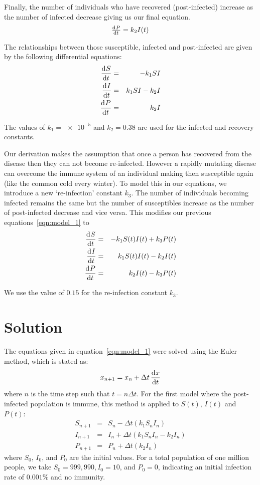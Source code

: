 \documentclass[a4paper,11pt]{article}
\begin{document}
Finally, the number of individuals who have recovered (post-infected) increase
as the number of infected decrease giving us our final equation.
\begin{equation}
\od{P}{t} = k_2I(t)
\end{equation}

The relationships between those susceptible, infected and post-infected are given
by the following differential equations:
\begin{eqnarray}
   \dod{S}{t} &=& -k_1SI         \nonumber \\
   \dod{I}{t} &=& k_1SI - k_2I   \nonumber \\
   \dod{P}{t} &=& k_2I
\label{eqn:model_1}
\end{eqnarray}

The values of $k_1 = \num{e-5}$ and $k_2 = 0.38$ are used for the infected and 
recovery constants.

Our derivation makes the assumption that once a person has recovered from 
the disease then they can not become re-infected. However a rapidly mutating 
disease can overcome the immune system of an individual making then susceptible 
again (like the common cold every winter). To model this in our equations, we 
introduce a new `re-infection' constant $k_3$. The number of individuals 
becoming infected remains the same but the number of susceptibles increase as 
the number of post-infected decrease and vice versa. This modifies our previous 
equations~\ref{eqn:model_1} to
\begin{eqnarray}
\dod{S}{t} &=& -k_1S(t)I(t) +k_3P(t)   \nonumber \\
\dod{I}{t} &=& k_1S(t)I(t) - k_2I(t)   \nonumber \\
\dod{P}{t} &=& k_2I(t) - k_3P(t)
\label{eqn:model_2}
\end{eqnarray}

We use the value of $0.15$ for the re-infection constant $k_3$.

\section{Solution}
The equations given in equation~\ref{eqn:model_1} were solved using the Euler method, which is 
stated as:
\begin{equation}
x_{n+1} = x_n + \Delta t \dod{x}{t}
\end{equation}
where $n$ is the time step such that $t = n\Delta t$. For the first model where the post-infected population is
immune, this method is applied to $S(t)$, $I(t)$ and $P(t)$:
\begin{eqnarray}
S_{n+1} &=& S_n - \Delta t(k_1 S_n I_n)  \nonumber \\
I_{n+1} &=& I_n + \Delta t(k_1 S_n I_n - k_2 I_n)  \nonumber \\
P_{n+1} &=& P_n + \Delta t(k_2 I_n) 
\end{eqnarray}
where $S_0$, $I_0$, and $P_0$ are the initial values. For a total population of one million people, we take $S_0 = 999, 990, I_0 = 10$, and $P_0 = 0$, indicating an initial infection rate of $0.001\%$ and no immunity.
\end{document}
